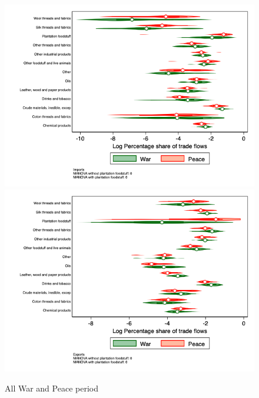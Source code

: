 \documentclass[12pt,a4paper,notitlepage,english]{article}
\begin{document}
\begin{appendix}
\begin{figure}[h!]
\caption{All War and Peace period}
\label{peace_war_nat_distr_sitc}
\includegraphics[scale=.4]{peace_war_nat_distr_Isitc}
\includegraphics[scale=.4]{peace_war_nat_distr_Xsitc}
\end{figure}


\end{appendix}
\end{document}
